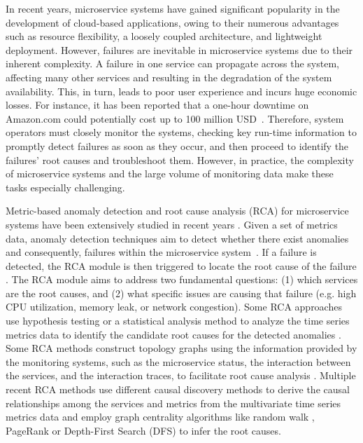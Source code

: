 In recent years, microservice systems have gained significant popularity in the development of cloud-based applications, owing to their numerous advantages such as resource flexibility, a loosely coupled architecture, and lightweight deployment. However, failures are inevitable in microservice systems due to their inherent complexity. A failure in one service can propagate across the system, affecting many other services and resulting in the degradation of the system availability. This, in turn, leads to poor user experience and incurs huge economic losses. For instance, it has been reported that a one-hour downtime on Amazon.com could potentially cost up to 100 million USD~\cite{Chen2019incienttriage, Chen2020incidentmanagment}. Therefore, system operators must closely monitor the systems, checking key run-time information to promptly detect failures as soon as they occur, and then proceed to identify the failures' root causes and troubleshoot them. However, in practice, the complexity of microservice systems and the large volume of monitoring data make these tasks especially challenging.

Metric-based anomaly detection and root cause analysis (RCA) for microservice systems have been extensively studied in recent years \cite{Soldani2022rcasurvey, Azam2022rcd, Li2022Circa, Xin2023CausalRCA, chen2022adaptive, siffer2017anomaly, wu2020microrca, Jinjin2018Microscope, yu2021microrank, liu2021microhecl,lee2023eadro}. Given a set of metrics data, anomaly detection techniques aim to detect whether there exist anomalies and consequently, failures within the microservice system~\cite{chen2022adaptive, lee2023eadro}. If a failure is detected, the RCA module is then triggered to locate the root cause of the failure \cite{lee2023eadro, Azam2022rcd, Li2022Circa}. The RCA module aims to address two fundamental questions: (1) which services are the root causes, and (2) what specific issues are causing that failure (e.g. high CPU utilization, memory leak, or network congestion). Some RCA approaches use hypothesis testing or a statistical analysis method to analyze the time series metrics data to identify the candidate root causes for the detected anomalies \cite{Shan2019Ediagnosis, Li2022Circa}. Some RCA methods construct topology graphs using the information provided by the monitoring systems, such as the microservice status, the interaction between the services, and the interaction traces, to facilitate root cause analysis \cite{wu2020microrca, liu2021microhecl}. Multiple recent RCA methods \cite{Xin2023CausalRCA, Azam2022rcd, Jinjin2018Microscope, Meng2020Microcause} use different causal discovery methods \cite{Runge2019PCMCI, Jaber2020PsiFCI, Spirtes1995fci} to derive the causal relationships among the services and metrics from the multivariate time series metrics data and employ graph centrality algorithms like random walk \cite{Jinjin2018Microscope}, PageRank \cite{Xin2023CausalRCA,wu2021microdiag} or Depth-First Search (DFS) \cite{Chen2014Causeinfer} to infer the root causes.


